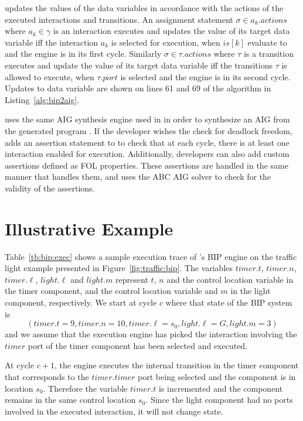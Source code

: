 \biptool{} updates the values of the data variables in accordance with the 
actions of the executed interactions and transitions. An assignment statement 
$\sigma \in a_k.actions$ where $a_k \in \gamma$ is an interaction executes 
and updates the value of its target data variable iff the interaction $a_k$ 
is selected for execution, \ie when $is[k]$ evaluate to \true{} and the engine
is in its first cycle. Similarly $\sigma \in \tau.actions$ where $\tau$ is a transition
executes and update the value of its target data variable iff the transitions $\tau$
is allowed to execute, \ie when $\tau.port$ is selected and the engine is in its
second cycle. Updates to data variable are shown on lines 61 and 69 of the 
algorithm in Listing~\ref{alg:bip2aig}.

\biptool{} uses the same AIG synthesis engine used in \mytool{} in order to 
synthesize an AIG from the generated \thislanguage{} program \aigcircuit. 
If the developer wishes the check for deadlock freedom, \biptool{} adds 
an assertion statement to \aigcircuit{} to check that at each cycle, 
there is at least one interaction enabled for execution. Additionally, 
developers can also add custom assertions defined as FOL properties. These assertions
are handled in the same manner that \mytool{} handles them, and \biptool{}
uses the ABC AIG solver to check for the validity of the assertions. 

\section{Illustrative Example}
Table~\ref{tb:bip:exec} shows a sample execution trace of \mytool's BIP engine
on the traffic light example presented in Figure~\ref{fig:traffic:bip}. The variables 
$timer.t$, $timer.n$, $timer.\ell$, $light.\ell$ and $light.m$ represent $t$, $n$
and the control location variable in the timer component, and the control location variable
and $m$ in the light component, respectively. 
We start at cycle $c$ where that state of the BIP system is $$\left(timer.t = 9, timer.n = 10,
timer.\ell = s_0, light.\ell = G, light.m = 3\right)$$
and we assume that the execution engine has picked the interaction involving the 
$timer$ port of the timer component has been selected and executed. 

At cycle $c+1$, the engine executes the internal transition in the timer component
that corresponds to the $timer.timer$ port being selected and the component is in location $s_0$. 
Therefore the variable $timer.t$ is incremented and the component 
remains in the same control location $s_0$. Since the light component
had no ports involved in the executed interaction, it will not change 
state. 

